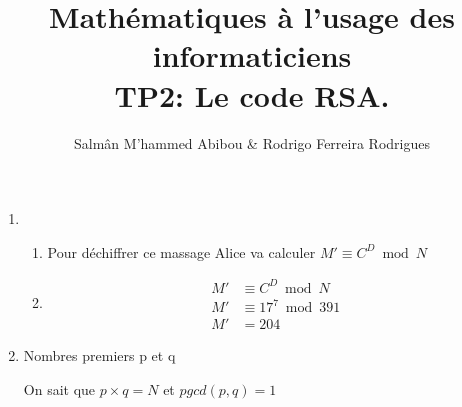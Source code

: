 \documentclass{homework}
\title{Mathématiques à l'usage des informaticiens\\
TP2: Le code RSA.}
\author{Salmân M'hammed Abibou \& Rodrigo Ferreira Rodrigues}
\begin{document}
	\maketitle
	\onehalfspacing
	\exercise
		\begin{enumerate}
    	\item 
    		\begin{enumerate}
    			\item Pour déchiffrer ce massage Alice va calculer $ M' \equiv C^D \bmod N $
    			\item 
    				\begin{equation*}
    					\begin{split}    				
    				M' &\equiv C^{D} \bmod N \\
    				M' & \equiv 17^7 \bmod 391 \\
    				M' & = 204
    					\end{split}
    				\end{equation*}
   			\end{enumerate}
   		
   		\item Nombres premiers p et q
   		
   	On sait que $p\times q = N$  et $pgcd(p,q) = 1$
		\end{enumerate}
\end{document}
